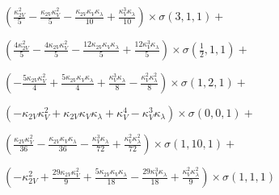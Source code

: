 $\left(\frac{\kappa_{2V}^{2}}{5} - \frac{\kappa_{2V} \kappa_{V}^{2}}{5} - \frac{\kappa_{2V} \kappa_{V} \kappa_{\lambda}}{10} + \frac{\kappa_{V}^{3} \kappa_{\lambda}}{10}\right) \times \sigma{\left(3,1,1 \right)} +$

$ \left(\frac{4 \kappa_{2V}^{2}}{5} - \frac{4 \kappa_{2V} \kappa_{V}^{2}}{5} - \frac{12 \kappa_{2V} \kappa_{V} \kappa_{\lambda}}{5} + \frac{12 \kappa_{V}^{3} \kappa_{\lambda}}{5}\right) \times \sigma{\left(\frac{1}{2},1,1 \right)} +$

$ \left(- \frac{5 \kappa_{2V} \kappa_{V}^{2}}{4} + \frac{5 \kappa_{2V} \kappa_{V} \kappa_{\lambda}}{4} + \frac{\kappa_{V}^{3} \kappa_{\lambda}}{8} - \frac{\kappa_{V}^{2} \kappa_{\lambda}^{2}}{8}\right) \times \sigma{\left(1,2,1 \right)} +$

$ \left(- \kappa_{2V} \kappa_{V}^{2} + \kappa_{2V} \kappa_{V} \kappa_{\lambda} + \kappa_{V}^{4} - \kappa_{V}^{3} \kappa_{\lambda}\right) \times \sigma{\left(0,0,1 \right)} +$

$ \left(\frac{\kappa_{2V} \kappa_{V}^{2}}{36} - \frac{\kappa_{2V} \kappa_{V} \kappa_{\lambda}}{36} - \frac{\kappa_{V}^{3} \kappa_{\lambda}}{72} + \frac{\kappa_{V}^{2} \kappa_{\lambda}^{2}}{72}\right) \times \sigma{\left(1,10,1 \right)} +$

$ \left(- \kappa_{2V}^{2} + \frac{29 \kappa_{2V} \kappa_{V}^{2}}{9} + \frac{5 \kappa_{2V} \kappa_{V} \kappa_{\lambda}}{18} - \frac{29 \kappa_{V}^{3} \kappa_{\lambda}}{18} + \frac{\kappa_{V}^{2} \kappa_{\lambda}^{2}}{9}\right) \times \sigma{\left(1,1,1 \right)}$
